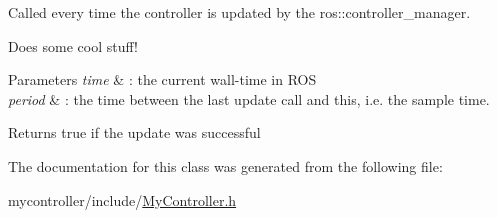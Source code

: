 Called every time the controller is updated by the ros\-::controller\-\_\-manager. 

Does some cool stuff!


\begin{DoxyParams}{Parameters}
{\em time} & \-: the current wall-\/time in R\-O\-S \\
\hline
{\em period} & \-: the time between the last update call and this, i.\-e. the sample time. \\
\hline
\end{DoxyParams}
\begin{DoxyReturn}{Returns}
true if the update was successful 
\end{DoxyReturn}


The documentation for this class was generated from the following file\-:\begin{DoxyCompactItemize}
\item 
mycontroller/include/\hyperlink{MyController_8h}{My\-Controller.\-h}\end{DoxyCompactItemize}
